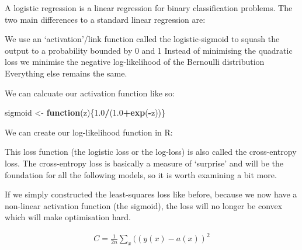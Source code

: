 \documentclass[]{book}
\newenvironment{Shaded}{\begin{snugshade}}{\end{snugshade}}
\newcommand{\ControlFlowTok}[1]{\textcolor[rgb]{0.13,0.29,0.53}{\textbf{#1}}}
\newcommand{\DecValTok}[1]{\textcolor[rgb]{0.00,0.00,0.81}{#1}}
\newcommand{\FloatTok}[1]{\textcolor[rgb]{0.00,0.00,0.81}{#1}}
\newcommand{\KeywordTok}[1]{\textcolor[rgb]{0.13,0.29,0.53}{\textbf{#1}}}
\newcommand{\NormalTok}[1]{#1}
\newcommand{\OperatorTok}[1]{\textcolor[rgb]{0.81,0.36,0.00}{\textbf{#1}}}
\newcommand{\StringTok}[1]{\textcolor[rgb]{0.31,0.60,0.02}{#1}}
\begin{document}
A logistic regression is a linear regression for binary classification problems. The two main differences to a standard linear regression are:

We use an `activation'/link function called the logistic-sigmoid to squash the output to a probability bounded by 0 and 1
Instead of minimising the quadratic loss we minimise the negative log-likelihood of the Bernoulli distribution
Everything else remains the same.

We can calcuate our activation function like so:

\begin{Shaded}
\begin{Highlighting}[]
\NormalTok{sigmoid <-}\StringTok{ }\ControlFlowTok{function}\NormalTok{(z)\{}\FloatTok{1.0}\OperatorTok{/}\NormalTok{(}\FloatTok{1.0}\OperatorTok{+}\KeywordTok{exp}\NormalTok{(}\OperatorTok{-}\NormalTok{z))\}}
\end{Highlighting}
\end{Shaded}

We can create our log-likelihood function in R:

\begin{Shaded}
\end{Shaded}

This loss function (the logistic loss or the log-loss) is also called the cross-entropy loss. The cross-entropy loss is basically a measure of `surprise' and will be the foundation for all the following models, so it is worth examining a bit more.

If we simply constructed the least-squares loss like before, because we now have a non-linear activation function (the sigmoid), the loss will no longer be convex which will make optimisation hard.

\[\begin{aligned} 
   C = \frac{1}{2n}\sum_x ((y(x) - a(x))^2
\end{aligned}\]
\end{document}
